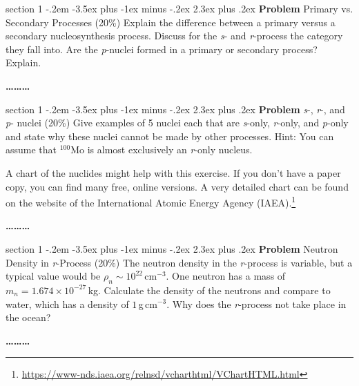 \documentclass[letterpaper,12pt,twoside=false,DIV=11]{scrartcl}
\makeatletter
\newenvironment{problem}{\@startsection
    {section}
    {1}
    {-.2em}
    {-3.5ex plus -1ex minus -.2ex}
    {2.3ex plus .2ex}
    {
        \pagebreak[3] %
        \noindent\sffamily\bfseries Problem
    }
}
{
    \begin{center}\large\bfseries\ldots\ldots\ldots\end{center}
}
\providecommand{\ex}[1]{\ensuremath{^{#1}}}
\makeatother
\begin{document}
\begin{problem}{Primary vs. Secondary Processes (20\%)}
Explain the difference between a primary versus a secondary nucleosynthesis process. Discuss for the \textit{s}- and \textit{r}-process the category they fall into. Are the \textit{p}-nuclei formed in a primary or secondary process? Explain.
\end{problem}


\begin{problem}{\textit{s}-, \textit{r}-, and \textit{p}- nuclei (20\%)}
Give examples of 5 nuclei each that are \textit{s}-only, \textit{r}-only, and \textit{p}-only and state why these nuclei cannot be made by other processes. Hint: You can assume that \ex{100}Mo is almost exclusively an \textit{r}-only nucleus. 

A chart of the nuclides might help with this exercise. If you don't have a paper copy, you can find many free, online versions. A very detailed chart can be found on the website of the International Atomic Energy Agency (IAEA).\footnote{\url{https://www-nds.iaea.org/relnsd/vcharthtml/VChartHTML.html}}
\end{problem}


\begin{problem}{Neutron Density in \textit{r}-Process (20\%)}
The neutron density in the \textit{r}-process is variable, but a typical value would be $\rho_n \sim 10^{22}\,\mathrm{cm}^{-3}$. One neutron has a mass of $m_n = 1.674\times10^{-27}$\,kg. Calculate the density of the neutrons and compare to water, which has a density of $1$\,g\,cm$^{-3}$. Why does the \textit{r}-process not take place in the ocean?
\end{problem}
\end{document}
